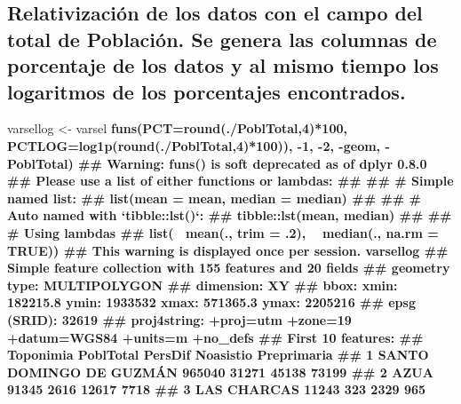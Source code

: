 \documentclass[11pt,]{article}
\newenvironment{Shaded}{\begin{snugshade}}{\end{snugshade}}
\newcommand{\KeywordTok}[1]{\textcolor[rgb]{0.13,0.29,0.53}{\textbf{#1}}}
\newcommand{\DataTypeTok}[1]{\textcolor[rgb]{0.13,0.29,0.53}{#1}}
\newcommand{\DecValTok}[1]{\textcolor[rgb]{0.00,0.00,0.81}{#1}}
\newcommand{\StringTok}[1]{\textcolor[rgb]{0.31,0.60,0.02}{#1}}
\newcommand{\OperatorTok}[1]{\textcolor[rgb]{0.81,0.36,0.00}{\textbf{#1}}}
\newcommand{\NormalTok}[1]{#1}
\begin{document}
\subsection{Relativización de los datos con el campo del total de
Población. Se genera las columnas de porcentaje de los datos y al mismo
tiempo los logaritmos de los porcentajes
encontrados.}\label{relativizaciuxf3n-de-los-datos-con-el-campo-del-total-de-poblaciuxf3n.-se-genera-las-columnas-de-porcentaje-de-los-datos-y-al-mismo-tiempo-los-logaritmos-de-los-porcentajes-encontrados.}

\begin{Shaded}
\begin{Highlighting}[]
\NormalTok{varsellog <-}\StringTok{ }\NormalTok{varsel }\OperatorTok{%
  \KeywordTok{funs}\NormalTok{(}\DataTypeTok{PCT=}\KeywordTok{round}\NormalTok{(.}\OperatorTok{/}\NormalTok{PoblTotal,}\DecValTok{4}\NormalTok{)}\OperatorTok{*}\DecValTok{100}\NormalTok{,}
       \DataTypeTok{PCTLOG=}\KeywordTok{log1p}\NormalTok{(}\KeywordTok{round}\NormalTok{(.}\OperatorTok{/}\NormalTok{PoblTotal,}\DecValTok{4}\NormalTok{)}\OperatorTok{*}\DecValTok{100}\NormalTok{)),}
  \OperatorTok{-}\DecValTok{1}\NormalTok{, }\OperatorTok{-}\DecValTok{2}\NormalTok{, }\OperatorTok{-}\NormalTok{geom, }\OperatorTok{-}\NormalTok{PoblTotal)}
\NormalTok{## Warning: funs() is soft deprecated as of dplyr 0.8.0}
\NormalTok{## Please use a list of either functions or lambdas: }
\NormalTok{## }
\NormalTok{##   # Simple named list: }
\NormalTok{##   list(mean = mean, median = median)}
\NormalTok{## }
\NormalTok{##   # Auto named with `tibble::lst()`: }
\NormalTok{##   tibble::lst(mean, median)}
\NormalTok{## }
\NormalTok{##   # Using lambdas}
\NormalTok{##   list(~ mean(., trim = .2), ~ median(., na.rm = TRUE))}
\NormalTok{## This warning is displayed once per session.}
\NormalTok{varsellog}
\NormalTok{## Simple feature collection with 155 features and 20 fields}
\NormalTok{## geometry type:  MULTIPOLYGON}
\NormalTok{## dimension:      XY}
\NormalTok{## bbox:           xmin: 182215.8 ymin: 1933532 xmax: 571365.3 ymax: 2205216}
\NormalTok{## epsg (SRID):    32619}
\NormalTok{## proj4string:    +proj=utm +zone=19 +datum=WGS84 +units=m +no_defs}
\NormalTok{## First 10 features:}
\NormalTok{##                  Toponimia PoblTotal PersDif Noasistio Preprimaria}
\NormalTok{## 1  SANTO DOMINGO DE GUZMÁN    965040   31271     45138       73199}
\NormalTok{## 2                     AZUA     91345    2616     12617        7718}
\NormalTok{## 3              LAS CHARCAS     11243     323      2329         965}
}
\end{Highlighting}
\end{Shaded}
\end{document}
